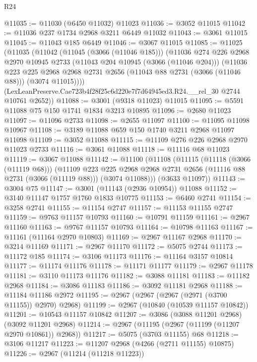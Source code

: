 \begin{lexlean}{R24}
\begin{coremodule}
@11035 := @11030 (@6450 @11032) @11023
@11036 := @3052 @11015
@11042 := @11036 @237 @1734 @2968 @3211 @6449 @11032
@11043 := @3061 @11015
@11045 := @11043 @185 @6449
@11046 := @3067 @11015
@11085 := @11025
    (@11035
      (@11042
        (@11045 (@3066 (@11046 @185)))
        (@11036
          @274
          @226
          @2968
          @2970
          @10945
          @2733
          (@11043 @204 @10945 (@3066 (@11046 @204)))
          (@11036
            @223
            @225
            @2968
            @2968
            @2731
            @2656
            (@11043 @88 @2731 (@3066 (@11046 @88)))
            (@3074 @11015))))
      (LexLeanPreserve.Cae723b4f28f25c6d220e7f7d64945ed3.R24.__rel_30 @2744 @10761 @2652))
@11088 := @3001 (@9318 @11023) @11015
@11095 := @5591 @11088 @75 @150 @1741 @1834 @3213 @10895
@11096 := @2680 @11023
@11097 := @11096 @2733
@11098 := @2655 @11097
@11100 := @11095 @11098 @10967
@11108 := @3189 @11088 @659 @150 @1740 @3211 @2968 @11097 @11098
@11109 := @3052 @11088
@11115 := @11109 @276 @226 @2968 @2970 @11023 @2733
@11116 := @3061 @11088
@11118 := @11116 @68 @11023
@11119 := @3067 @11088
@11142 := @11100
    (@11108
      (@11115
        (@11118 (@3066 (@11119 @68)))
        (@11109
          @223
          @225
          @2968
          @2968
          @2731
          @2656
          (@11116 @88 @2731 (@3066 (@11119 @88)))
          (@3074 @11088)))
      (@3633 @11097))
@11143 := @3004 @75
@11147 := @3001 (@11143 (@2936 @10954)) @11088
@11152 := @3140 @11147 @1757 @1760 @1833 @10775
@11153 := @6460 @2741
@11154 := @3258 @2741
@11155 := @11154 @2747
@11157 := @11153 @11155 @2747
@11159 := @9763 @11157 @10793
@11160 := @10791 @11159
@11161 := @2967 @11160
@11163 := @9767 @11157 @10793
@11164 := @10798 @11163
@11167 := @11161 (@11164 @2970 @10803)
@11169 := @2967 @11167 @2968
@11170 := @3214 @11169
@11171 := @2967 @11170
@11172 := @5075 @2744
@11173 := @11172 @185
@11174 := @3106 @11173
@11176 := @11164 @3157 @10814
@11177 := @11174 @11176
@11178 := @11171 @11177
@11179 := @2967 @11178
@11181 := @3110 @11173 @11176
@11182 := @3088 @11181
@11183 := @11182 @2968
@11184 := @3086 @11183
@11186 := @3092 @11181 @2968
@11188 := @11184 @11186 @2972
@11195 := @2967 (@2967 (@2967 (@2971 (@3700 @11155)) @2970) @2968)
@11199 := @2967 (@10840 (@10539 @11157 @10842))
@11201 := @10543 @11157 @10842
@11207 := @3086 (@3088 @11201 @2968) (@3092 @11201 @2968)
@11214 := @2967 (@11195 (@2967 (@11199 (@11207 @2970 @10861)) @2968))
@11217 := @5075 (@3703 @11155) @68
@11218 := @3106 @11217
@11223 := @11207 @2968 (@4266 (@2711 @11155) @10875)
@11226 := @2967 (@11214 (@11218 @11223))

\end{coremodule}
\end{lexlean}
